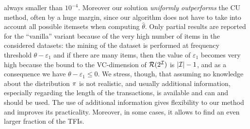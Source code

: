 always smaller than $10^{-4}$. Moreover our solution
\emph{uniformly outperforms} the CU method, often by a huge margin, since
 our algorithm does not have to take into account all
possible itemsets when computing $\hat\theta$. %
Only partial results are reported for the ``vanilla'' variant because of the
very high number of items in the considered datasets: the mining of the
dataset is performed at frequency threshold $\theta-\varepsilon_1$  and if there
are many items, then the value of $\varepsilon_1$ becomes very high because the
bound to the VC-dimension of $\mathcal{R}(2^{\cal I})$ is $|{\cal I}|-1$, and as a
consequence we have $\theta-\varepsilon_1\le 0$. %
We stress, though, that assuming no knowledge about the distribution $\pi$ is not realistic, and
usually additional information, especially regarding the length of the
transactions, is available and can and should be used. The use of 
additional information gives flexibility to our method and improves its
practicality. Moreover, in some cases, it allows to find an even larger fraction
of the TFIs.


